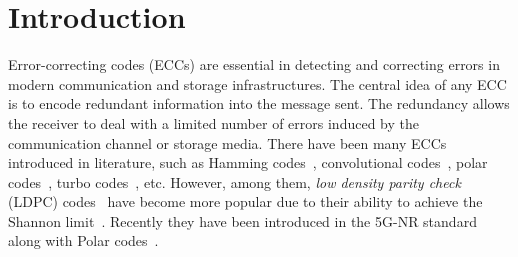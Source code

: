 \section{Introduction}

Error-correcting codes (ECCs) are essential in detecting and correcting
errors in modern communication and storage infrastructures. The central idea
of any ECC is to encode redundant information into the message sent. 
The redundancy allows the receiver to deal with a limited number
of errors induced by the communication channel or storage media. There
have been many ECCs introduced in literature, such as Hamming codes~\cite{hamming1950error}, convolutional codes~\cite{viterbi1971convolutional},
polar codes~\cite{arikan2008performance}, turbo codes~\cite{berrou1993near},
etc. However, among them, \emph{low density parity check} (LDPC)
codes~\cite{gallager1962low} have become more popular due to their
ability to achieve the Shannon limit~\cite{mackay1999good}. Recently
they have been introduced in the 5G-NR standard along with Polar
codes~\cite{bae2019overview}.


